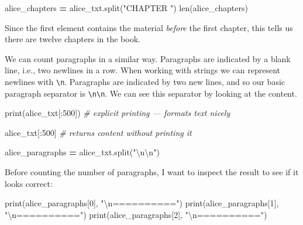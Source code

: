 \documentclass[]{book}
\newenvironment{Shaded}{\begin{snugshade}}{\end{snugshade}}
\newcommand{\DecValTok}[1]{\textcolor[rgb]{0.00,0.00,0.81}{#1}}
\newcommand{\CharTok}[1]{\textcolor[rgb]{0.31,0.60,0.02}{#1}}
\newcommand{\StringTok}[1]{\textcolor[rgb]{0.31,0.60,0.02}{#1}}
\newcommand{\CommentTok}[1]{\textcolor[rgb]{0.56,0.35,0.01}{\textit{#1}}}
\newcommand{\OperatorTok}[1]{\textcolor[rgb]{0.81,0.36,0.00}{\textbf{#1}}}
\newcommand{\BuiltInTok}[1]{#1}
\newcommand{\NormalTok}[1]{#1}
\begin{document}
\begin{Shaded}
\begin{Highlighting}[]
\NormalTok{alice_chapters }\OperatorTok{=}\NormalTok{ alice_txt.split(}\StringTok{"CHAPTER "}\NormalTok{)}
\BuiltInTok{len}\NormalTok{(alice_chapters)}
\end{Highlighting}
\end{Shaded}

Since the first element contains the material \emph{before} the first
chapter, this tells us there are twelve chapters in the book.

We can count paragraphs in a similar way. Paragraphs are indicated by a
blank line, i.e., two newlines in a row. When working with strings we
can represent newlines with \texttt{\textbackslash{}n}. Paragraphs are
indicated by two new lines, and so our basic paragraph separator is
\texttt{\textbackslash{}n\textbackslash{}n}. We can see this separator
by looking at the content.

\begin{Shaded}
\begin{Highlighting}[]
\BuiltInTok{print}\NormalTok{(alice_txt[:}\DecValTok{500}\NormalTok{]) }\CommentTok{# explicit printing --- formats text nicely}

\NormalTok{alice_txt[:}\DecValTok{500}\NormalTok{] }\CommentTok{# returns content without printing it}
\end{Highlighting}
\end{Shaded}

\begin{Shaded}
\begin{Highlighting}[]
\NormalTok{alice_paragraphs }\OperatorTok{=}\NormalTok{ alice_txt.split(}\StringTok{"}\CharTok{\textbackslash{}n\textbackslash{}n}\StringTok{"}\NormalTok{)}
\end{Highlighting}
\end{Shaded}

Before counting the number of paragraphs, I want to inspect the result
to see if it looks correct:

\begin{Shaded}
\begin{Highlighting}[]
\BuiltInTok{print}\NormalTok{(alice_paragraphs[}\DecValTok{0}\NormalTok{], }\StringTok{"}\CharTok{\textbackslash{}n}\StringTok{=========="}\NormalTok{)}
\BuiltInTok{print}\NormalTok{(alice_paragraphs[}\DecValTok{1}\NormalTok{], }\StringTok{"}\CharTok{\textbackslash{}n}\StringTok{=========="}\NormalTok{)}
\BuiltInTok{print}\NormalTok{(alice_paragraphs[}\DecValTok{2}\NormalTok{], }\StringTok{"}\CharTok{\textbackslash{}n}\StringTok{=========="}\NormalTok{)}
\end{Highlighting}
\end{Shaded}
\end{document}
